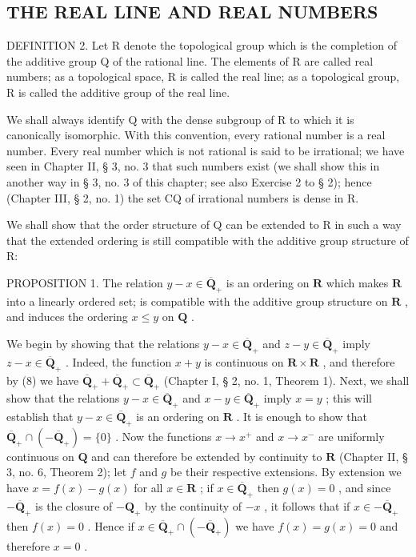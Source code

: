 \subsection{THE REAL LINE AND REAL NUMBERS}

DEFINITION 2. Let R denote the topological group which is the completion of the additive group Q of the rational line. The elements of R are called real numbers; as a topological space, R is called the real line; as a topological group, R is called the additive group of the real line.

We shall always identify Q with the dense subgroup of R to which it is canonically isomorphic. With this convention, every rational number is a real number. Every real number which is not rational is said to be irrational; we have seen in Chapter II, § 3, no. 3 that such numbers exist (we shall show this in another way in § 3, no. 3 of this chapter; see also Exercise 2 to § 2); hence (Chapter III, § 2, no. 1) the set CQ of irrational numbers is dense in R.

We shall show that the order structure of Q can be extended to R in such a way that the extended ordering is still compatible with the additive group structure of R:

PROPOSITION 1. The relation \(y - x \in \overline{\mathbf{Q}}_+\) is an ordering on \(\mathbf{R}\) which makes \(\mathbf{R}\) into a linearly ordered set; is compatible with the additive group structure on \(\mathbf{R}\) , and induces the ordering \(x \leqslant y\) on \(\mathbf{Q}\) .

We begin by showing that the relations \(y - x \in \overline{\mathbf{Q}}_+\) and \(z - y \in \overline{\mathbf{Q}}_+\) imply \(z - x \in \overline{\mathbf{Q}}_+\) . Indeed, the function \(x + y\) is continuous on \(\mathbf{R} \times \mathbf{R}\) , and therefore by (8) we have \(\overline{\mathbf{Q}}_+ + \overline{\mathbf{Q}}_+ \subset \overline{\mathbf{Q}}_+\) (Chapter I, § 2, no. 1, Theorem 1). Next, we shall show that the relations \(y - x \in \overline{\mathbf{Q}}_+\) and \(x - y \in \overline{\mathbf{Q}}_+\) imply \(x = y\) ; this will establish that \(y - x \in \overline{\mathbf{Q}}_+\) is an ordering on \(\mathbf{R}\) . It is enough to show that \(\overline{\mathbf{Q}}_+ \cap (-\overline{\mathbf{Q}}_+) = \{0\}\) . Now the functions \(x \to x^+\) and \(x \to x^-\) are uniformly continuous on \(\mathbf{Q}\) and can therefore be extended by continuity to \(\mathbf{R}\) (Chapter II, § 3, no. 6, Theorem 2); let \(f\) and \(g\) be their respective extensions. By extension we have \(x = f(x) - g(x)\) for all \(x \in \mathbf{R}\) ; if \(x \in \overline{\mathbf{Q}}_+\) then \(g(x) = 0\) , and since \(-\overline{\mathbf{Q}}_+\) is the closure of \(-\mathbf{Q}_+\) by the continuity of \(-x\) , it follows that if \(x \in -\overline{\mathbf{Q}}_+\) then \(f(x) = 0\) . Hence if \(x \in \overline{\mathbf{Q}}_+ \cap (-\overline{\mathbf{Q}}_+)\) we have \(f(x) = g(x) = 0\) and therefore \(x = 0\) .

